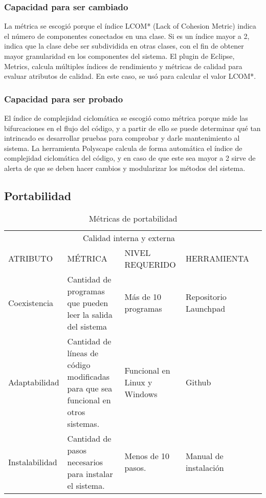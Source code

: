 \documentclass[12pt]{article}
\begin{document}
\subsubsection{Capacidad para ser cambiado}
\vspace*{0.1in}
La métrica se escogió porque el índice LCOM* (Lack of Cohesion Metric) indica el número de componentes conectados en una clase. Si es un índice mayor a 2, indica que la clase debe ser subdividida en otras clases, con el fin de obtener mayor granularidad en los componentes del sistema. El plugin de Eclipse, Metrics, calcula múltiples índices de rendimiento y métricas de calidad para evaluar atributos de calidad. En este caso, se usó para calcular el valor LCOM*.
\vspace*{0.3in}
\subsubsection{Capacidad para ser probado}
\vspace*{0.1in}
El índice de complejidad ciclomática se escogió como métrica porque mide las bifurcaciones en el flujo del código, y a partir de ello se puede determinar qué tan intrincado es desarrollar pruebas para comprobar y darle mantenimiento al sistema. La herramienta Polyscape calcula de forma automática el índice de complejidad ciclomática del código, y en caso de que este sea mayor a 2 sirve de alerta de que se deben hacer cambios y modularizar los métodos del sistema.



\vspace*{0.3in}
\subsection{Portabilidad}%
\vspace*{0.3in}
\begin{table}[htb]%
\centering
\begin{tabular}{|p{4cm}|p{4cm}|p{4cm}|p{4cm}|p{4cm}|}
\hline
\multicolumn{4}{|c|}{Calidad interna y externa   } \\
\cline{1-4}
ATRIBUTO & MÉTRICA & NIVEL REQUERIDO & HERRAMIENTA\\
\hline \hline
Coexistencia 
& Cantidad de programas que pueden leer la salida del sistema
& Más de 10 programas
& Repositorio Launchpad\\ \cline{1-4}
\hline
Adaptabilidad 
& Cantidad de líneas de código modificadas para que sea funcional en otros sistemas.
& Funcional en Linux y Windows
& Github\\ \cline{1-4}
\hline
Instalabilidad
& Cantidad de pasos necesarios para instalar el sistema.
& Menos de 10 pasos.
& Manual de instalación\\ \cline{1-4}
\hline
\end{tabular}
\caption{Métricas de portabilidad}
\label{tabla:final}
\end{table}%
\vspace*{0.3in}
\end{document}
